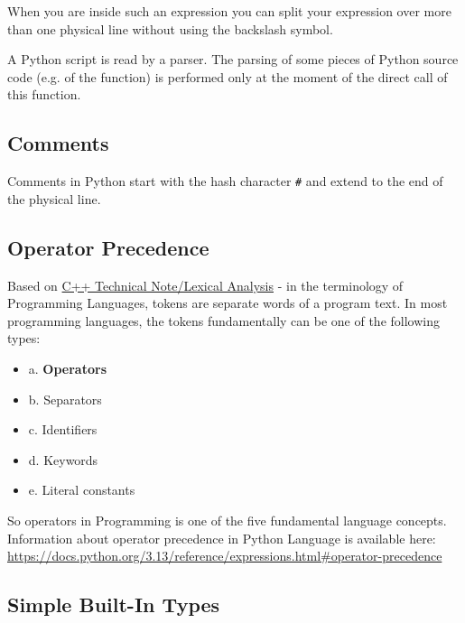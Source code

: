 \documentclass[
]{article}
\begin{document}
When you are inside such an expression you can split your expression
over more than one physical line without using the backslash symbol.

A Python script is read by a parser. The parsing of some pieces of
Python source code (e.g. of the function) is performed only at the
moment of the direct call of this function.

\hypertarget{comments}{%
\subsection{Comments}\label{comments}}

Comments in Python start with the hash character \texttt{\#} and extend
to the end of the physical line.

\hypertarget{operator-precedence}{%
\subsection{Operator Precedence}\label{operator-precedence}}

Based on
\href{https://github.com/burlachenkok/CPP_from_1998_to_2020/blob/main/Cpp-Technical-Note.md\#lexical-analysis}{C++
Technical Note/Lexical Analysis} - in the terminology of Programming
Languages, tokens are separate words of a program text. In most
programming languages, the tokens fundamentally can be one of the
following types:

\begin{itemize}
\item
  a. \textbf{Operators}
\item
  b. Separators
\item
  c. Identifiers
\item
  d. Keywords
\item
  e. Literal constants
\end{itemize}

So operators in Programming is one of the five fundamental language
concepts. Information about operator precedence in Python Language is
available here:\\
\url{https://docs.python.org/3.13/reference/expressions.html\#operator-precedence}

\hypertarget{simple-built-in-types}{%
\subsection{Simple Built-In Types}\label{simple-built-in-types}}
\end{document}
